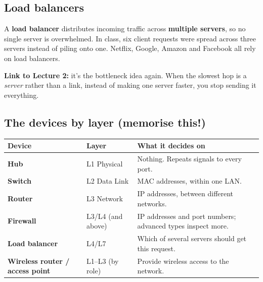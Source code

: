 \subsection{Load balancers}
A \textbf{load balancer} distributes incoming traffic across \textbf{multiple servers}, so no single server is overwhelmed. In class, six client requests were spread across three servers instead of piling onto one. Netflix, Google, Amazon and Facebook all rely on load balancers.

\begin{center}
\end{center}

\textbf{Link to Lecture 2:} it's the bottleneck idea again. When the slowest hop is a \emph{server} rather than a link, instead of making one server faster, you stop sending it everything.

\subsection{The devices by layer (memorise this!)}
\begin{center}
\begin{tabularx}{\textwidth}{>{\bfseries}l l X}
\toprule
Device & Layer & What it decides on \\
\midrule
Hub & L1 Physical & Nothing. Repeats signals to every port. \\
Switch & L2 Data Link & MAC addresses, within one LAN. \\
Router & L3 Network & IP addresses, between different networks. \\
Firewall & L3/L4 (and above) & IP addresses and port numbers; advanced types inspect more. \\
Load balancer & L4/L7 & Which of several servers should get this request. \\
Wireless router / access point & L1--L3 (by role) & Provide wireless access to the network. \\
\bottomrule
\end{tabularx}
\end{center}

